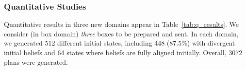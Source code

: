 \documentclass[letterpaper]{article} %
\begin{document}

\subsubsection{Quantitative Studies}

Quantitative results in three new domains appear in Table~\ref{tab:q_results}. 
We consider (in box domain) \textit{three} boxes to be prepared and sent. 
In each domain, we generated 512 different initial states, including 448 (87.5\%) with divergent initial beliefs and 64 states where beliefs are fully aligned initially. 
Overall, 3072 plans were generated.
\end{document}
